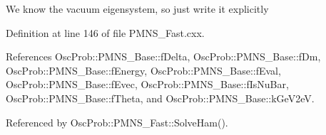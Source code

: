 We know the vacuum eigensystem, so just write it explicitly 

Definition at line 146 of file P\+M\+N\+S\+\_\+\+Fast.\+cxx.



References Osc\+Prob\+::\+P\+M\+N\+S\+\_\+\+Base\+::f\+Delta, Osc\+Prob\+::\+P\+M\+N\+S\+\_\+\+Base\+::f\+Dm, Osc\+Prob\+::\+P\+M\+N\+S\+\_\+\+Base\+::f\+Energy, Osc\+Prob\+::\+P\+M\+N\+S\+\_\+\+Base\+::f\+Eval, Osc\+Prob\+::\+P\+M\+N\+S\+\_\+\+Base\+::f\+Evec, Osc\+Prob\+::\+P\+M\+N\+S\+\_\+\+Base\+::f\+Is\+Nu\+Bar, Osc\+Prob\+::\+P\+M\+N\+S\+\_\+\+Base\+::f\+Theta, and Osc\+Prob\+::\+P\+M\+N\+S\+\_\+\+Base\+::k\+Ge\+V2eV.



Referenced by Osc\+Prob\+::\+P\+M\+N\+S\+\_\+\+Fast\+::\+Solve\+Ham().


